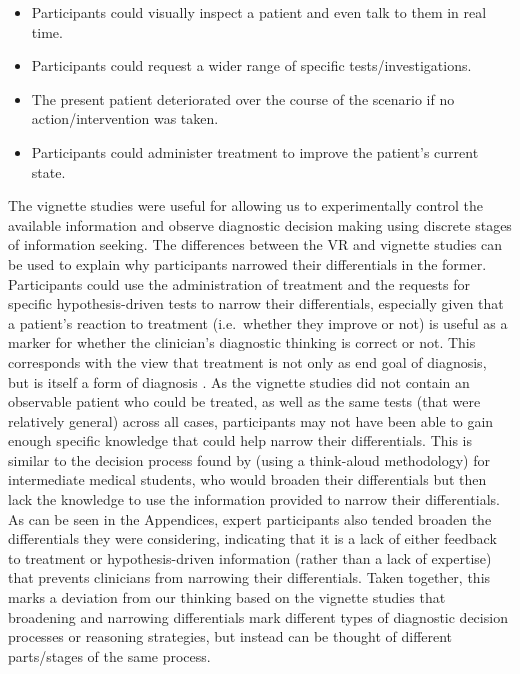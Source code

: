 \documentclass[a4paper, nobind]{templates/ociamthesis}
\providecommand{\tightlist}{%
  \setlength{\itemsep}{0pt}\setlength{\parskip}{0pt}}
\begin{document}
\begin{itemize}
\tightlist
\item
  Participants could visually inspect a patient and even talk to them in real time.
\item
  Participants could request a wider range of specific tests/investigations.
\item
  The present patient deteriorated over the course of the scenario if no action/intervention was taken.
\item
  Participants could administer treatment to improve the patient's current state.
\end{itemize}

The vignette studies were useful for allowing us to experimentally control the available information and observe diagnostic decision making using discrete stages of information seeking. The differences between the VR and vignette studies can be used to explain why participants narrowed their differentials in the former. Participants could use the administration of treatment and the requests for specific hypothesis-driven tests to narrow their differentials, especially given that a patient's reaction to treatment (i.e.~whether they improve or not) is useful as a marker for whether the clinician's diagnostic thinking is correct or not. This corresponds with the view that treatment is not only as end goal of diagnosis, but is itself a form of diagnosis \autocite{brody_diagnosis_1980}. As the vignette studies did not contain an observable patient who could be treated, as well as the same tests (that were relatively general) across all cases, participants may not have been able to gain enough specific knowledge that could help narrow their differentials. This is similar to the decision process found by \textcite{arocha_novice_1995} (using a think-aloud methodology) for intermediate medical students, who would broaden their differentials but then lack the knowledge to use the information provided to narrow their differentials. As can be seen in the Appendices, expert participants also tended broaden the differentials they were considering, indicating that it is a lack of either feedback to treatment or hypothesis-driven information (rather than a lack of expertise) that prevents clinicians from narrowing their differentials. Taken together, this marks a deviation from our thinking based on the vignette studies that broadening and narrowing differentials mark different types of diagnostic decision processes or reasoning strategies, but instead can be thought of different parts/stages of the same process.
\end{document}
